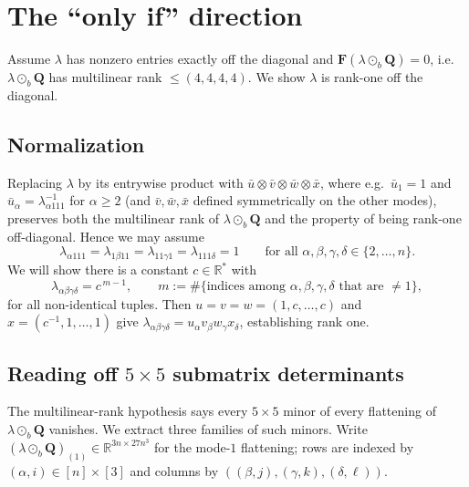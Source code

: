 \documentclass[11pt]{article}
\newcommand{\R}{\mathbb{R}}
\newcommand{\bQ}{\mathbf{Q}}
\newcommand{\bF}{\mathbf{F}}
\begin{document}
\section*{The ``only if'' direction}

Assume $\lambda$ has nonzero entries exactly off the diagonal and
$\bF(\lambda\odot_b\bQ)=0$, i.e.\ $\lambda\odot_b\bQ$ has multilinear rank
$\le(4,4,4,4)$. We show $\lambda$ is rank-one off the diagonal.

\subsection*{Normalization}

Replacing $\lambda$ by its entrywise product with $\bar u\otimes\bar v\otimes\bar w\otimes\bar x$,
where e.g.\ $\bar u_1=1$ and $\bar u_\alpha=\lambda_{\alpha111}^{-1}$ for
$\alpha\ge2$ (and $\bar v,\bar w,\bar x$ defined symmetrically on the other
modes), preserves both the multilinear rank of $\lambda\odot_b\bQ$ and the
property of being rank-one off-diagonal. Hence we may assume
\begin{equation}\label{eq:normalize}
  \lambda_{\alpha111}=\lambda_{1\beta11}=\lambda_{11\gamma1}=\lambda_{111\delta}=1
  \qquad\text{for all }\alpha,\beta,\gamma,\delta\in\{2,\dots,n\}.
\end{equation}
We will show there is a constant $c\in\R^{*}$ with
\begin{equation}\label{eq:goal}
  \lambda_{\alpha\beta\gamma\delta}=c^{\,m-1},
  \qquad m:=\#\{\text{indices among }\alpha,\beta,\gamma,\delta\text{ that are }\ne 1\},
\end{equation}
for all non-identical tuples. Then $u=v=w=(1,c,\dots,c)$ and
$x=(c^{-1},1,\dots,1)$ give $\lambda_{\alpha\beta\gamma\delta}=u_\alpha v_\beta w_\gamma x_\delta$,
establishing rank one.

\subsection*{Reading off $5\times5$ submatrix determinants}

The multilinear-rank hypothesis says every $5\times5$ minor of every flattening
of $\lambda\odot_b\bQ$ vanishes. We extract three families of such minors. Write
$(\lambda\odot_b\bQ)_{(1)}\in\R^{3n\times27n^3}$ for the mode-$1$ flattening;
rows are indexed by $(\alpha,i)\in[n]\times[3]$ and columns by
$((\beta,j),(\gamma,k),(\delta,\ell))$.
\end{document}
